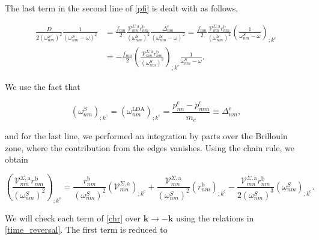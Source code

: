 \documentclass[11pt]{article}
\begin{document}
The last term in the second line of \eqref{pfi} is dealt with as follows,

\begin{align}\label{dresn}
\frac{D}{2(\omega^S_{nm})^2}\frac{1}{(\omega^S_{nm}-\omega)^2} 
&= \frac{f_{mn}}{2}\frac{\mathcal{V}^{\Sigma,\text{a}}_{mn}r^{\text{b}}_{nm}}{(\omega^S_{nm})^2}\frac{\Delta^{\text{c}}_{nm}}{(\omega^S_{nm}-\omega)^2} = \frac{f_{mn}}{2}\frac{\mathcal{V}^{\Sigma,\text{a}}_{mn}r^{\text{b}}_{nm}}{(\omega^S_{nm})^2}\left(\frac{1}{\omega^S_{nm}-\omega}\right)_{;k^{\text{c}}}\nonumber\\
&= -\frac{f_{mn}}{2}\left(\frac{\mathcal{V}^{\Sigma,\text{a}}_{mn}r^{\text{b}}_{nm}}{(\omega^S_{nm})^2}\right)_{;k^{\text{c}}}\frac{1}{\omega^S_{nm}-\omega}.
\end{align} 

We use the fact that

\begin{equation}\label{wk}
(\omega^S_{nm})_{;k^{\text{c}}}=(\omega^\text{LDA}_{nm})_{;k^{\text{c}}} = \frac{p_{nn}^{\text{c}}-p_{mm}^{\text{c}}}{m_{e}} \equiv \Delta_{nm}^{\text{c}},
\end{equation}

and for the last line, we performed an integration by parts over the Brillouin zone, where the contribution from the edges vanishes. Using the chain rule, we obtain

\begin{equation}\label{chr}
\left(\frac{\mathcal{V}^{\Sigma,\text{a}}_{mn}r^{\text{b}}_{nm}}{(\omega^{S}_{nm})^2}\right)_{;k^{\text{c}}} = \frac{r^{\text{b}}_{nm}}{(\omega^{S}_{nm})^2}\left(\mathcal{V} ^{\Sigma,\text{a}}_{mn}\right)_{;k^{\text{c}}} + \frac{\mathcal{V}^{\Sigma,\text{a}}_{mn}}{(\omega^{S}_{nm})^2}\left(r^{\text{b}}_{nm}\right)_{;k^{\text{c}}} - \frac{\mathcal{V}^{\Sigma,\text{a}}_{mn}r^{\text{b}}_{nm}}{2(\omega^{S}_{nm})^3}\left(
\omega^{S}_{nm}\right)_{;k^{\text{c}}}.
\end{equation}

We will check each term of \eqref{chr} over $\mathbf{k} \rightarrow - \mathbf{k}$ using the relations in \eqref{time_reversal}. The first term is reduced to
\end{document}
